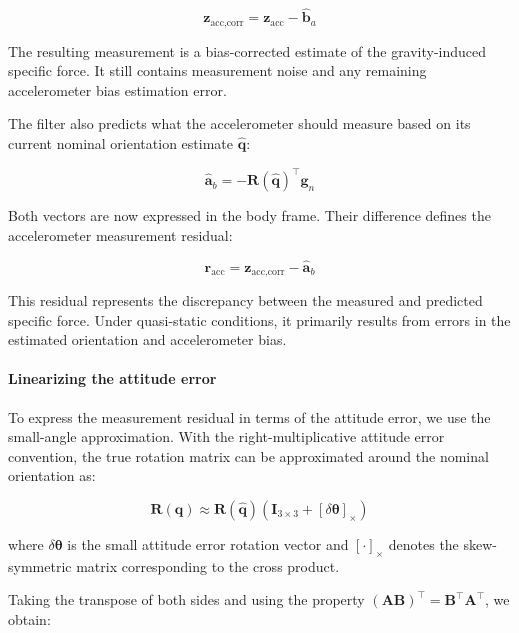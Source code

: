 \documentclass{article}
\begin{document}
	\begin{equation*}
		\mathbf{z}_{\text{acc,corr}} =
		\mathbf{z}_{\text{acc}} - \hat{\mathbf{b}}_a
	\end{equation*}
	
	The resulting measurement is a bias-corrected estimate of the gravity-induced specific force. It still contains measurement noise and any remaining accelerometer bias estimation error.
	
	The filter also predicts what the accelerometer should measure based on its current nominal orientation estimate $\hat{\mathbf{q}}$:
	
	\begin{equation*}
		\hat{\mathbf{a}}_b =
		-\mathbf{R}(\hat{\mathbf{q}})^\top \mathbf{g}_n
	\end{equation*}
	
	Both vectors are now expressed in the body frame. Their difference defines the accelerometer measurement residual:
	
	\begin{equation*}
		\mathbf{r}_{\text{acc}} =
		\mathbf{z}_{\text{acc,corr}} - \hat{\mathbf{a}}_b
	\end{equation*}
	
	This residual represents the discrepancy between the measured and predicted specific force. Under quasi-static conditions, it primarily results from errors in the estimated orientation and accelerometer bias.
	
	\paragraph{Linearizing the attitude error}
	
	To express the measurement residual in terms of the attitude error, we use the small-angle approximation. With the right-multiplicative attitude error convention, the true rotation matrix can be approximated around the nominal orientation as:
	
	\begin{equation*}
		\mathbf{R}(\mathbf{q}) \approx
		\mathbf{R}(\hat{\mathbf{q}})
		\left(\mathbf{I}_{3\times3}
		+ [\delta\boldsymbol{\theta}]_\times\right)
	\end{equation*}
	
	where $\delta\boldsymbol{\theta}$ is the small attitude error rotation vector and $[\cdot]_\times$ denotes the skew-symmetric matrix corresponding to the cross product.
	
	Taking the transpose of both sides and using the property $(\mathbf{A}\mathbf{B})^\top = \mathbf{B}^\top\mathbf{A}^\top$, we obtain:
	
\end{document}
